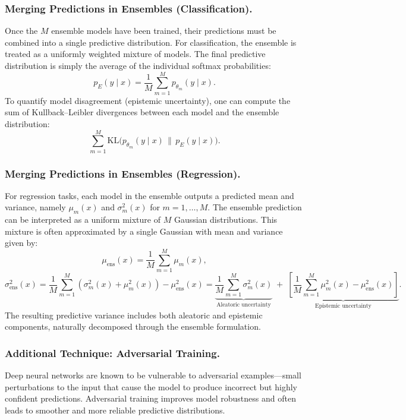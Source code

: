 \subsubsection{Merging Predictions in Ensembles (Classification).}  
Once the $M$ ensemble models have been trained, their predictions must be combined into a single predictive distribution. For classification, the ensemble is treated as a uniformly weighted mixture of models. The final predictive distribution is simply the average of the individual softmax probabilities:
\[
p_{E}(y \mid x) = \frac{1}{M} \sum_{m=1}^{M} p_{\theta_m}(y \mid x).
\]
To quantify model disagreement (epistemic uncertainty), one can compute the sum of Kullback–Leibler divergences between each model and the ensemble distribution:
\[
\sum_{m=1}^{M} \mathrm{KL}\big( p_{\theta_m}(y \mid x) \,\|\, p_{E}(y \mid x) \big).
\]

\subsubsection{Merging Predictions in Ensembles (Regression).}  
For regression tasks, each model in the ensemble outputs a predicted mean and variance, namely $\mu_m(x)$ and $\sigma_m^2(x)$ for $m = 1, \dots, M$. The ensemble prediction can be interpreted as a uniform mixture of $M$ Gaussian distributions. This mixture is often approximated by a single Gaussian with mean and variance given by:
\[
\mu_{\text{ens}}(x) = \frac{1}{M} \sum_{m=1}^{M} \mu_m(x),
\]
\[
\sigma_{\text{ens}}^{2}(x) 
= 
\frac{1}{M} \sum_{m=1}^{M} \left( \sigma_m^{2}(x) + \mu_m^{2}(x) \right) - \mu_{\text{ens}}^{2}(x)
=
\underbrace{
\frac{1}{M} \sum_{m=1}^{M} \sigma_m^{2}(x)
}_{\text{Aleatoric uncertainty}}
\;+\;
\underbrace{
\left[
\frac{1}{M} \sum_{m=1}^{M} \mu_m^{2}(x)
- \mu_{\text{ens}}^{2}(x)
\right]
}_{\text{Epistemic uncertainty}}.
\]
The resulting predictive variance includes both aleatoric and epistemic components, naturally decomposed through the ensemble formulation.

\subsubsection{Additional Technique: Adversarial Training.}  
Deep neural networks are known to be vulnerable to adversarial examples—small perturbations to the input that cause the model to produce incorrect but highly confident predictions. Adversarial training improves model robustness and often leads to smoother and more reliable predictive distributions.

